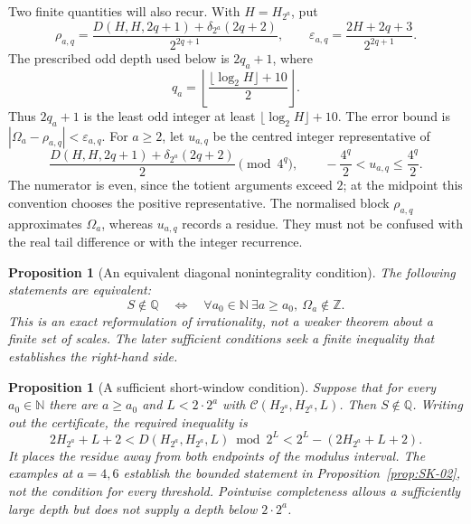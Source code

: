 \documentclass[11pt]{article}
\theoremstyle{plain}
\newtheorem{prop}[thm]{Proposition}
\theoremstyle{definition}
\theoremstyle{remark}
\begin{document}
Two finite quantities will also recur. With $H=H_{2^a}$, put
\[
 \rho_{a,q}=\frac{D(H,H,2q+1)+\delta_{2^a}(2q+2)}{2^{2q+1}},
 \qquad \varepsilon_{a,q}=\frac{2H+2q+3}{2^{2q+1}}.
\]
The prescribed odd depth used below is $2q_a+1$, where
\[
 q_a=\left\lfloor\frac{\lfloor\log_2 H\rfloor+10}{2}\right\rfloor.
\]
Thus $2q_a+1$ is the least odd integer at least
$\lfloor\log_2 H\rfloor+10$. The error bound is
$|\Omega_a-\rho_{a,q}|<\varepsilon_{a,q}$.
For $a\ge2$, let $u_{a,q}$ be the centred integer representative of
\[
 \frac{D(H,H,2q+1)+\delta_{2^a}(2q+2)}2\pmod{4^q},
 \qquad -\frac{4^q}2<u_{a,q}\le\frac{4^q}2.
\]
The numerator is even, since the totient arguments exceed $2$; at the
midpoint this convention chooses the positive representative. The
normalised block $\rho_{a,q}$ approximates $\Omega_a$, whereas
$u_{a,q}$ records a residue. They must not be confused with the real
tail difference or with the integer recurrence.

\begin{prop}[An equivalent diagonal nonintegrality condition]\label{prop:NI-01}
The following statements are equivalent:
\[
 S\notin\mathbb Q
 \quad\Longleftrightarrow\quad
 \forall a_0\in\mathbb N\ \exists a\ge a_0,\ \Omega_a\notin\mathbb Z.
\]
This is an exact reformulation of irrationality, not a weaker theorem
about a finite set of scales. The later sufficient conditions seek a
finite inequality that establishes the right-hand side.
\end{prop}

\begin{prop}[A sufficient short-window condition]\label{prop:AR-07}
Suppose that for every $a_0\in\mathbb N$ there are $a\ge a_0$
and $L<2\cdot2^a$ with $\mathcal C(H_{2^a},H_{2^a},L)$. Then
$S\notin\mathbb Q$. Writing out the certificate, the required inequality is
\[
 2H_{2^a}+L+2
 <D(H_{2^a},H_{2^a},L)\bmod2^L
 <2^L-(2H_{2^a}+L+2).
\]
It places the residue away from both endpoints of the modulus interval.
The examples at $a=4,6$ establish the bounded statement in
Proposition~\ref{prop:SK-02}, not the condition for every threshold.
Pointwise completeness allows a sufficiently large depth but does not
supply a depth below $2\cdot2^a$.

\end{prop}
\end{document}
